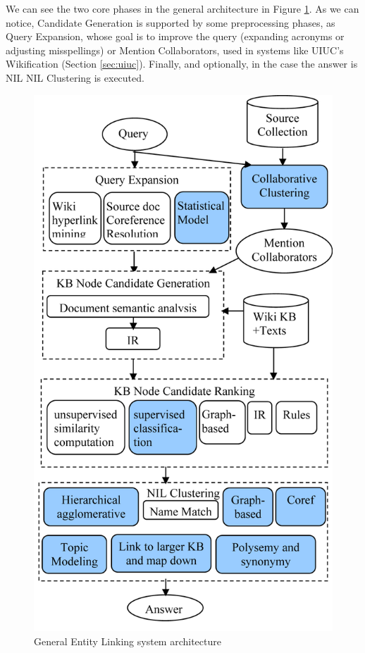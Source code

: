 \documentclass[a4paper,11pt]{report}
\begin{document}
We can see the two core phases in the general architecture in Figure \ref{fig:el_arch}. As we can notice, Candidate Generation is supported by some preprocessing phases, as Query Expansion, whose goal is to improve the query (expanding acronyms or adjusting misspellings) or Mention Collaborators, used in systems like UIUC's Wikification (Section \ref{sec:uiuc}). %
 Finally, and optionally, in the case the answer is NIL NIL Clustering is executed.
 
\begin{figure}[htbp] 
\centering
\includegraphics[]{el_architecture}
\caption{General Entity Linking system architecture}
\label{fig:el_arch}
\end{figure}
\end{document}
